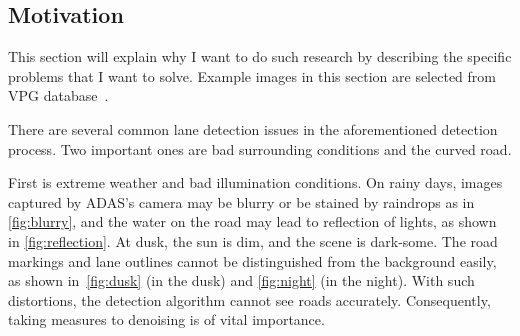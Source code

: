 \begin{spacing}{1.5}
\section{Motivation}
\label{sec:IN_motivation}

This section will explain why I want to do such research by describing the specific problems that I want to solve. Example images in this section are selected from VPG database~\cite{lee2017vpgnet}.

There are several common lane detection issues in the aforementioned detection process. Two important ones are bad surrounding conditions and the curved road.

First is extreme weather and bad illumination conditions. On rainy days, images captured by ADAS’s camera may be blurry or be stained by raindrops as in \autoref{fig:blurry}, and the water on the road may lead to reflection of lights, as shown in \autoref{fig:reflection}. At dusk, the sun is dim, and the scene is dark-some. The road markings and lane outlines cannot be distinguished from the background easily, as shown in~\autoref{fig:dusk} (in the dusk) and \autoref{fig:night} (in the night). With such distortions, the detection algorithm cannot see roads accurately. Consequently, taking measures to denoising is of vital importance. 



\end{spacing}
